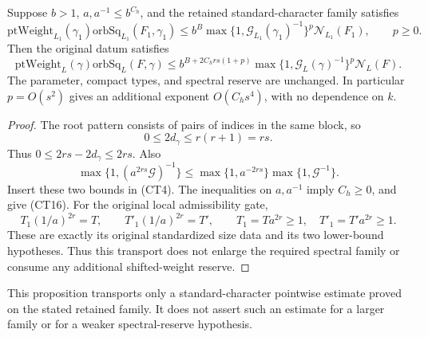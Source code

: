 \begin{corollary}
\label{cor:archimedean-character-return}
Suppose \(b>1\), \(a,a^{-1}\le b^{C_h}\), and the retained
standard-character family satisfies
\[
 \mathrm{ptWeight}_{L_1}(\gamma_1)
      \mathrm{orbSq}_{L_1}(F_1,\gamma_1)
 \le b^B
       \max\{1,\mathcal G_{L_1}(\gamma_1)^{-1}\}^{p}
                           \mathcal N_{L_1}(F_1),
 \qquad p\ge0 .
\]
Then the original datum satisfies
\[
 \mathrm{ptWeight}_L(\gamma)\mathrm{orbSq}_L(F,\gamma)
 \le b^{B+2C_hrs(1+p)}
       \max\{1,\mathcal G_L(\gamma)^{-1}\}^{p}
                                      \mathcal N_L(F).
                                                        \tag{CT16}
\]
The parameter, compact types, and spectral reserve are
unchanged. In particular \(p=O(s^2)\) gives an additional
exponent \(O(C_hs^4)\), with no dependence on \(k\).
\end{corollary}
\begin{proof}
The root pattern consists of pairs of indices in the
same block, so
\[
             0\le2d_\gamma\le r(r+1)=rs.
\]
Thus \(0\le2rs-2d_\gamma\le2rs\). Also
\[
 \max\{1,(a^{2rs}\mathcal G)^{-1}\}
       \le\max\{1,a^{-2rs}\}\max\{1,\mathcal G^{-1}\}.
\]
Insert these two bounds in (CT4). The inequalities on
\(a,a^{-1}\) imply \(C_h\ge0\), and give (CT16).
For the original local admissibility gate,
\[
 T_1(1/a)^{2r}=T,\qquad T'_1(1/a)^{2r}=T',
 \qquad T_1=Ta^{2r}\ge1,\quad T'_1=T'a^{2r}\ge1.
\]
These are exactly its original standardized size data
and its two lower-bound hypotheses. Thus this transport
does not enlarge the required spectral family or consume
any additional shifted-weight reserve.
\end{proof}

This proposition transports only a standard-character
pointwise estimate proved on the stated retained family.
It does not assert such an estimate for a larger family
or for a weaker spectral-reserve hypothesis.

